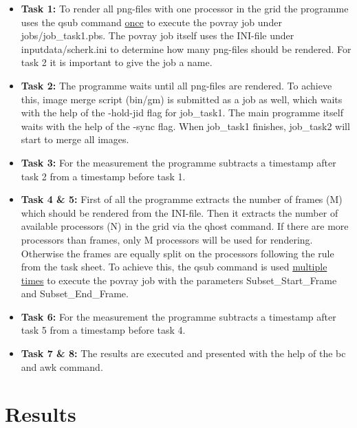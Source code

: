 \documentclass{article}
\begin{document}
\begin{itemize}
\item \textbf{Task 1:} To render all png-files with one processor in the grid the programme uses the qsub command \underline{once} to execute the povray job under jobs/job\_task1.pbs. The povray job itself uses the INI-file under inputdata/scherk.ini to determine how many png-files should be rendered. For task 2 it is important to give the job a name.
\item \textbf{Task 2:} The programme waits until all png-files are rendered. To achieve this, image merge script (bin/gm) is submitted as a job as well, which waits with the help of the -hold-jid flag for job\_task1. The main programme itself waits with the help of the -sync flag. When job\_task1 finishes, job\_task2 will start to merge all images.
\item \textbf{Task 3:} For the measurement the programme subtracts a timestamp after task 2 from a timestamp before task 1.
\item \textbf{Task 4 \& 5:} First of all the programme extracts the number of frames (M) which should be rendered from the INI-file. Then it extracts the number of available processors (N) in the grid via the qhost command. If there are more processors than frames, only M processors will be used for rendering. Otherwise the frames are equally split on the processors following the rule from the task sheet. To achieve this, the qsub command is used \underline{multiple times} to execute the povray job with the parameters Subset\_Start\_Frame and Subset\_End\_Frame.
\item \textbf{Task 6:} For the measurement the programme subtracts a timestamp after task 5 from a timestamp before task 4.
\item \textbf{Task 7 \& 8:} The results are executed and presented with the help of the bc and awk command.
\end{itemize}



\section{Results}
\end{document}
